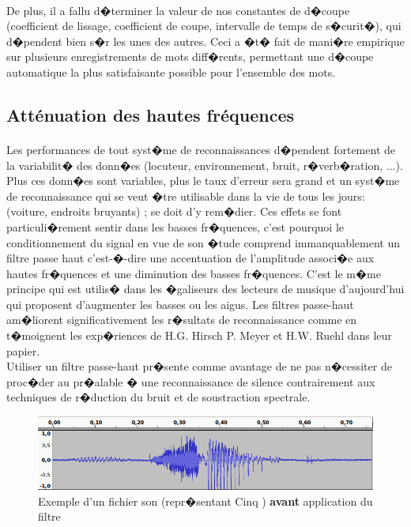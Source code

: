 \paragraph{}
	De plus, il a fallu d�terminer la valeur de nos constantes de d�coupe (coefficient de lissage, coefficient de coupe, intervalle de temps de s�curit�), 
	qui d�pendent bien s�r les unes des autres. Ceci a �t� fait de mani�re empirique sur plusieurs enregistrements de mots diff�rents, permettant une d�coupe automatique la plus satisfaisante possible pour l'ensemble des mots.
    \subsection{Atténuation des hautes fréquences}
\paragraph{}
	Les performances de tout syst�me de reconnaissances d�pendent fortement de la variabilit� 
	des donn�es (locuteur, environnement, bruit, r�verb�ration, ...). Plus ces donn�es sont variables, 
	plus le taux d'erreur sera grand et un syst�me de reconnaissance qui se veut �tre utilisable dans la vie de tous les jours: 
	(voiture, endroits bruyants) ; se doit d'y rem�dier. Ces effets se font particuli�rement sentir dans les basses fr�quences, 
	c'est pourquoi le conditionnement du signal en vue de son �tude comprend immanquablement un filtre passe haut  
	c'est-�-dire une accentuation de l'amplitude associ�e aux hautes fr�quences et une diminution des basses fr�quences. 
	C'est le m�me principe qui est utilis� dans les �galiseurs des lecteurs de musique d'aujourd'hui qui proposent d'augmenter 
	les basses ou les aigus. Les filtres passe-haut am�liorent significativement les r�sultats de reconnaissance comme en 
	t�moignent les exp�riences de H.G. Hirsch P. Meyer et H.W. Ruehl dans leur papier\cite{highpass}.\\
	Utiliser un filtre passe-haut pr�sente comme avantage de ne pas n�cessiter de proc�der au pr�alable 
	� une reconnaissance de silence contrairement aux techniques de r�duction du bruit et de soustraction spectrale.
\begin{figure}[H]
	    \begin{center}
		    \includegraphics[width=15cm]{Images/passehautavant.png} 
	    \end{center}
	    \caption{Exemple d'un fichier son (repr�sentant \og Cinq \fg) \textbf{avant} application du filtre}
\end{figure}
